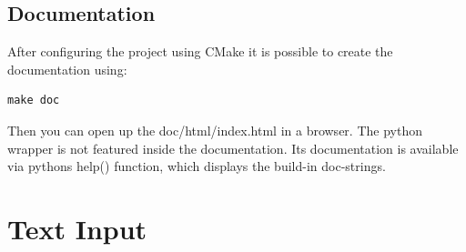 \documentclass[bibliography=totocnumbered,a4paper,10pt]{scrartcl}
\begin{document}
\subsection{Documentation}
After configuring the project using CMake it is possible to create the documentation 
using:
\begin{lstlisting}
make doc
\end{lstlisting}
Then you can open up the doc/html/index.html in a browser.  
The python wrapper is not featured inside the documentation.
Its documentation is available via pythons help() function,
which displays the build-in doc-strings.

\clearpage
\section{Text Input}
\end{document}

